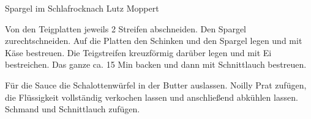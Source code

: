 \begin{recipe}{Spargel im Schlafrock}{nach Lutz Moppert}


  \steps
  Von den Teigplatten jeweils 2 Streifen abschneiden. Den Spargel zurechtschneiden. Auf
  die Platten den Schinken und den Spargel legen und mit Käse bestreuen. Die Teigstreifen
  kreuzförmig darüber legen und mit Ei bestreichen. Das ganze ca. 15 Min backen und dann
  mit Schnittlauch bestreuen.

  Für die Sauce die Schalottenwürfel in der Butter auslassen. Noilly Prat zufügen, die
  Flüssigkeit vollständig verkochen lassen und anschließend abkühlen lassen. Schmand und
  Schnittlauch zufügen.
\end{recipe}
